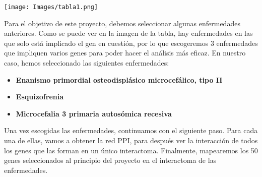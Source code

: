        \texttt{[image: Images/tabla1.png]}
        
        Para el objetivo de este proyecto, debemos seleccionar algunas enfermedades anteriores. Como se puede ver en la imagen de la tabla, hay enfermedades en las que solo está implicado el gen en cuestión, por lo que escogeremos 3 enfermedades que impliquen varios genes para poder hacer el análisis más eficaz. En nuestro caso, hemos seleccionado las siguientes enfermedades:
        
            \begin{itemize}
            \item \textbf{Enanismo primordial osteodisplásico microcefálico, tipo II}
            \item \textbf{Esquizofrenia}
            \item \textbf{Microcefalia 3 primaria autosómica recesiva}
            \end{itemize}

        Una vez escogidas las enfermedades, continuamos con el siguiente paso. Para cada una de ellas, vamos a obtener la red PPI, para después ver la interacción de todos los genes que las forman en un único interactoma. Finalmente, mapearemos los 50 genes seleccionados al principio del proyecto en el interactoma de las enfermedades.